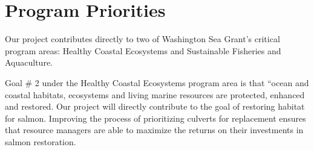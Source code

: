 \documentclass[12pt]{elsarticle}
\begin{document}


\section{Program Priorities} %

Our project contributes directly to two of Washington Sea Grant's critical program areas: Healthy Coastal Ecosystems and Sustainable Fisheries and Aquaculture. 

Goal \# 2 under the Healthy Coastal Ecosystems program area is that ``ocean and coastal habitats, ecosystems and living marine resources are protected, enhanced and restored. Our project will directly contribute to the goal of restoring habitat for salmon. Improving the process of prioritizing culverts for replacement ensures that resource managers are able to maximize the returns on their investments in salmon restoration.
\end{document}
